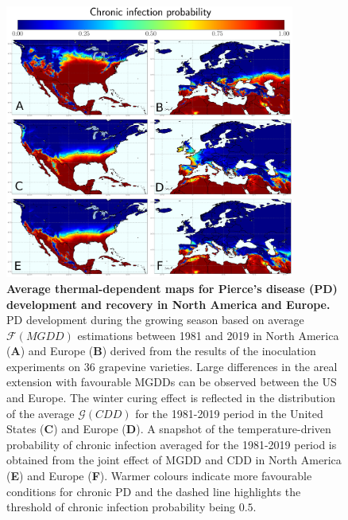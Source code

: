    \begin{figure}[H]
        \centering
        \includegraphics[width=0.85\textwidth]{Figures/Fig1_new.pdf}
        \caption{\textbf{Average thermal-dependent maps for Pierce's disease
                (PD)
                development and recovery in North America and Europe.} PD
            development during
            the growing season based on average $\mathcal{F}(MGDD)$ estimations
            between
            1981 and 2019 in North America (\textbf{A}) and Europe (\textbf{B})
            derived
            from the results of the inoculation experiments on 36 grapevine
            varieties.
            Large differences in the areal extension with favourable MGDDs can
            be observed
            between the US and Europe. The winter curing effect is reflected in
            the
            distribution of the average $\mathcal{G}(CDD)$ for the 1981-2019
            period in the
            United States (\textbf{C}) and Europe (\textbf{D}). A snapshot of
            the
            temperature-driven probability of chronic infection averaged for
            the 1981-2019
            period is obtained from the joint effect of MGDD and CDD in North
            America
            (\textbf{E}) and Europe (\textbf{F}). Warmer colours indicate more
            favourable
            conditions for chronic PD and the dashed line highlights the
            threshold of
            chronic infection probability being $0.5$.}
        \label{fig2}
    \end{figure}

